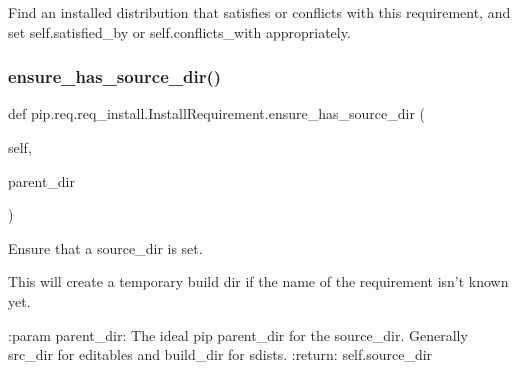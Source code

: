 \begin{DoxyVerb}Find an installed distribution that satisfies or conflicts
with this requirement, and set self.satisfied_by or
self.conflicts_with appropriately.
\end{DoxyVerb}
 \mbox{\label{classpip_1_1req_1_1req__install_1_1_install_requirement_a6ff5e1d477f3b0701c3e8d7fe808c320}} 
\subsubsection{\texorpdfstring{ensure\+\_\+has\+\_\+source\+\_\+dir()}{ensure\_has\_source\_dir()}}
{\footnotesize\ttfamily def pip.\+req.\+req\+\_\+install.\+Install\+Requirement.\+ensure\+\_\+has\+\_\+source\+\_\+dir (\begin{DoxyParamCaption}\item[{}]{self,  }\item[{}]{parent\+\_\+dir }\end{DoxyParamCaption})}

\begin{DoxyVerb}Ensure that a source_dir is set.

This will create a temporary build dir if the name of the requirement
isn't known yet.

:param parent_dir: The ideal pip parent_dir for the source_dir.
    Generally src_dir for editables and build_dir for sdists.
:return: self.source_dir
\end{DoxyVerb}
 \mbox{\label{classpip_1_1req_1_1req__install_1_1_install_requirement_a5ad0a53aaefb11efa58236e5466654cb}} 
